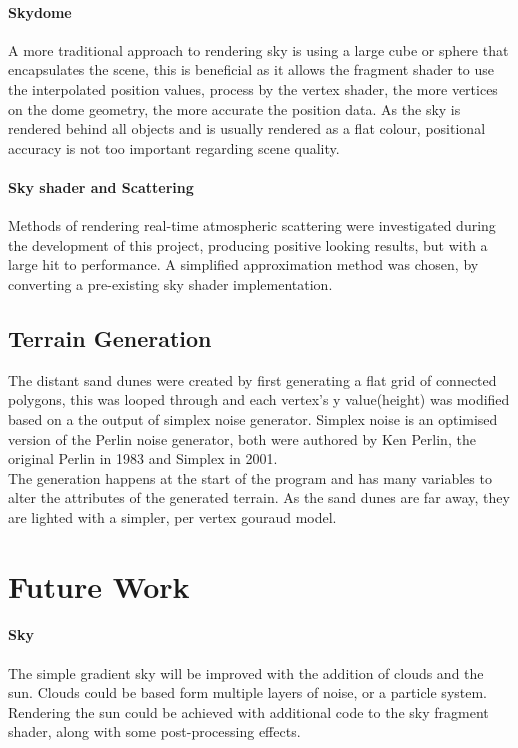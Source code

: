 \documentclass[conference]{acmsiggraph}
\begin{document}
\paragraph{Skydome}
A more traditional approach to rendering sky is using a large cube or sphere that encapsulates the scene, this is beneficial as it allows the fragment shader to use the interpolated position values, process by the vertex shader, the more vertices on the dome geometry, the more accurate the position data. As the sky is rendered behind all objects and is usually rendered as a flat colour, positional accuracy is not too important regarding scene quality.

\paragraph{Sky shader and Scattering}
Methods of rendering real-time atmospheric scattering were investigated during the development of this project, producing positive looking results, but with a large hit to performance. A simplified approximation method was chosen, by converting a pre-existing sky shader implementation. \cite{reliegh}

\subsection{Terrain Generation}
The distant sand dunes were created by first generating a flat grid of connected polygons, this was looped through and each vertex's y value(height) was modified based on a the output of simplex noise generator. Simplex noise is an optimised version of the Perlin noise generator, both were authored by Ken Perlin, the original Perlin in 1983 and Simplex in 2001.\\
The generation happens at the start of the program and has many variables to alter the attributes of the generated terrain. As the sand dunes are far away, they are lighted with a simpler, per vertex gouraud model.

\section{Future Work}

\paragraph{Sky}
The simple gradient sky will be improved with the addition of clouds and the sun. Clouds could be based form multiple layers of noise, or a particle system. Rendering the sun could be achieved with additional code to the sky fragment shader, along with some post-processing effects.
\end{document}

